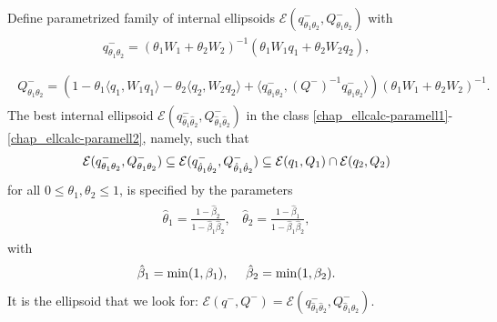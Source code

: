 \documentclass[letterpaper,10pt,english]{sphinxmanual}
\begin{document}
Define parametrized family of internal ellipsoids
\({\mathcal E}(q^-_{\theta_1\theta_2},Q^-_{\theta_1\theta_2})\) with
\label{chap_ellcalc:equation-paramell1}\begin{gather}
\begin{split}q^-_{\theta_1\theta_2}  =  (\theta_1W_1 +
\theta_2W_2)^{-1}(\theta_1W_1q_1 + \theta_2W_2q_2),\\\end{split}\label{chap_ellcalc-paramell1}
\end{gather}\label{chap_ellcalc:equation-paramell2}\begin{gather}
\begin{split}Q^-_{\theta_1\theta_2} =  (1 - \theta_1\langle q_1,W_1q_1\rangle -
\theta_2\langle q_2,W_2q_2\rangle +
\langle q^-_{\theta_1\theta_2},(Q^-)^{-1}q^-_{\theta_1\theta_2}\rangle)
(\theta_1W_1 + \theta_2W_2)^{-1} .\end{split}\label{chap_ellcalc-paramell2}
\end{gather}
The best internal ellipsoid
\({\mathcal E}(q^-_{\hat{\theta}_1\hat{\theta}_2},Q^-_{\hat{\theta}_1\hat{\theta}_2})\)
in the class \eqref{chap_ellcalc-paramell1}-\eqref{chap_ellcalc-paramell2}, namely, such that
\begin{gather}
\begin{split}{\mathcal E}(q^-_{{\theta}_1{\theta}_2},Q^-_{{\theta}_1{\theta}_2})\subseteq
{\mathcal E}(q^-_{\hat{\theta}_1\hat{\theta}_2},Q^-_{\hat{\theta}_1\hat{\theta}_2})
\subseteq {\mathcal E}(q_1,Q_1)\cap{\mathcal E}(q_2,Q_2)\end{split}\notag
\end{gather}
for all \(0\leqslant\theta_1,\theta_2\leqslant1\), is specified by
the parameters
\label{chap_ellcalc:equation-thetapar}\begin{gather}
\begin{split}\hat{\theta}_1 = \frac{1-\hat{\beta}_2}{1-\hat{\beta}_1\hat{\beta}_2}, ~~~~
\hat{\theta}_2 = \frac{1-\hat{\beta}_1}{1-\hat{\beta}_1\hat{\beta}_2},\end{split}\label{chap_ellcalc-thetapar}
\end{gather}
with
\begin{gather}
\begin{split}\hat{\beta}_1=\min(1,\beta_1), ~~~~ \hat{\beta}_2=\min(1,\beta_2).\end{split}\notag
\end{gather}
It is the ellipsoid that we look for:
\({\mathcal E}(q^-,Q^-)={\mathcal E}(q^-_{\hat{\theta}_1\hat{\theta}_2},Q^-_{\hat{\theta}_1\hat{\theta}_2})\).
\end{document}
